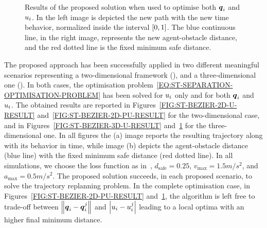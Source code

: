 \begin{figure}[!t]
\begin{center}
\begin{minipage}{.45\linewidth}
		\end{minipage}
	\end{center}
	\caption{Results of the proposed solution when used to optimise both $\boldsymbol{q}_i$ and $u_i$.
    In the left image is depicted the new path with the new time behavior, normalized inside the interval $\left[ 0,1 \right]$.
    The blue continuous line, in the right image, represents the new agent-obstacle distance, and the red dotted line is the
    fixed minimum safe distance.}%
    \label{FIG:ST-BEZIER-3D-PU-RESULT}
\end{figure}
The proposed approach has been successfully applied in two different meaningful scenarios representing a two-dimensional
framework (), and a three-dimensional one ().
In both cases, the optimisation problem~\eqref{EQ:ST-SEPARATION-OPTIMISATION-PROBLEM} has been solved for $u_i$ only
and for both $\boldsymbol{q}_i$ and $u_i$. The obtained results are reported in Figures~\ref{FIG:ST-BEZIER-2D-U-RESULT}
and~\ref{FIG:ST-BEZIER-2D-PU-RESULT} for the two-dimensional case, and in Figures~\ref{FIG:ST-BEZIER-3D-U-RESULT}
and~\ref{FIG:ST-BEZIER-3D-PU-RESULT} for the three-dimensional one. In all figures the (a) image reports the resulting
trajectory along with its behavior in time, while image (b) depicts the agent-obstacle distance (blue line) with the fixed
minimum safe distance (red dotted line). In all simulations, we choose the loss function as in~,
$d_{\text{safe}} = 0.25$, $v_{\text{max}} = 1.5m/s^2$, and $a_{\text{max}} = 0.5 m/s^2$.
The proposed solution succeeds, in each proposed scenario, to solve the trajectory replanning problem.
In the complete optimisation case, in Figures~\ref{FIG:ST-BEZIER-2D-PU-RESULT} and~\ref{FIG:ST-BEZIER-3D-PU-RESULT},
the algorithm is left free to trade-off between $\left \lVert {\boldsymbol{q}_i - \boldsymbol{q}_i^j} \right \rVert$ and $\left| u_i - u_i^j \right|$
leading to a local optima with an higher final minimum distance.

